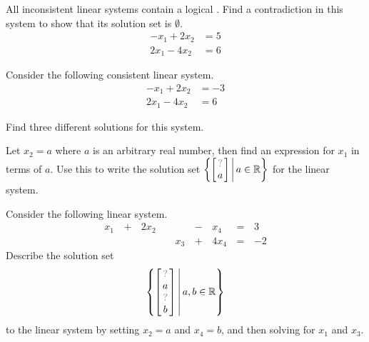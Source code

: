 \begin{applicationActivities}
\begin{activity}{10}
  All inconsistent linear systems contain a logical .
  Find a contradiction in this system to show that its solution set
  is \(\emptyset\).
  \begin{align*}
  -x_1+2x_2  &=  5 \\
  2x_1-4x_2  &=  6
  \end{align*}
\end{activity}

\begin{activity}{10}
  Consider the following consistent linear system.
  \begin{align*}
  -x_1+2x_2  &= -3 \\
  2x_1-4x_2  &=  6
  \end{align*}
\begin{subactivity}
  Find three different solutions
  for this system.
\end{subactivity}
\begin{subactivity}
  Let \(x_2=a\) where \(a\) is an arbitrary real number, then find an
  expression for \(x_1\) in terms of \(a\). Use this to write
  the solution set
  \(
    \left\{
	\begin{bmatrix}
      \unknown \\
      a
    \end{bmatrix} \,\middle|\, a \in \IR
	\right\}
  \)
  for the linear system.
\end{subactivity}
\end{activity}

\begin{activity}{10}
  Consider the following linear system.
  \begin{alignat*}{5}
    x_1 &\,+\,& 2x_2 &\, \,&     &\,-\,&  x_4 &\,=\,& 3 \\
        &\, \,&      &\, \,& x_3 &\,+\,& 4x_4 &\,=\,& -2
  \end{alignat*}
  Describe the solution set
  \[
  	\left\{
	\begin{bmatrix}
      \unknown \\
      a \\
      \unknown \\
      b
	\end{bmatrix} \,\middle|\, a,b \in \IR \right\}
  \]
  to the linear system
  by setting \(x_2=a\) and \(x_4=b\), and then solving for \(x_1\) and
  \(x_3\).
\end{activity}


\end{applicationActivities}
